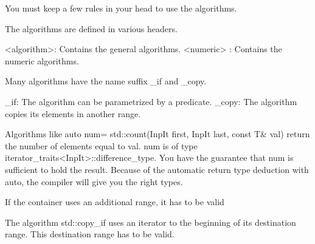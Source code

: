 You must keep a few rules in your head to use the algorithms.

The algorithms are defined in various headers.

<algorithm>: Contains the general algorithms.
<numeric> : Contains the numeric algorithms.

Many algorithms have the name suffix \_if and \_copy.

\_if: The algorithm can be parametrized by a predicate.
\_copy: The algorithm copies its elements in another range.

Algorithms like auto num= std::count(InpIt first, InpIt last, const T\& val) return the number of elements equal to val. num is of type iterator\_traits<InpIt>::difference\_type. You have the guarantee that num is sufficient to hold the result. Because of the automatic return type deduction with auto, the compiler will give you the right types.

\begin{myTip}{If the container uses an additional range, it has to be valid}

The algorithm std::copy\_if uses an iterator to the beginning of its destination range. This destination range has to be valid.
\end{myTip}

